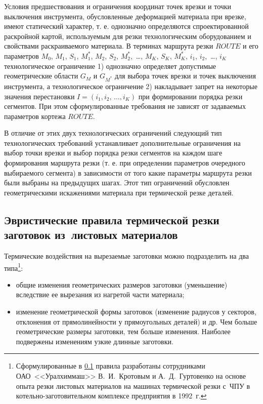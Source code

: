 \documentclass[11pt,twoside,openany]{report}
\begin{document}
Условия предшествования и ограничения координат точек врезки
и точки выключения инструмента,
обусловленные деформацией материала при врезке,
имеют статический характер,
т. е. однозначно определяются спроектированной раскройной картой,
используемым для резки технологическим оборудованием
и свойствами раскраиваемого материала.
В терминах маршрута резки $ROUTE$
и его параметров
$M_0$, $M_1$, $S_1$, $M_1^*$, $M_2$, $S_2$, $M_2^*$, \,\dots, $M_K$, $S_K$, $M_K^*$,
$i_1$, $i_2$, \,\dots, $i_K$
технологическое ограничение
1) однозначно определяет допустимые геометрические области
$G_M$
и
$G_{M^*}$
для выбора точек врезки и точек выключения инструмента,
а технологическое ограничение
2) накладывает запрет на некоторые значения перестановки
$ I = (i_1, i_2, \,\dots, i_K)$
при формировании порядка резки сегментов.
При этом сформулированные требования не зависят от задаваемых параметров кортежа
$ROUTE$.

В отличие от этих двух технологических ограничений
следующий тип технологических требований устанавливает
дополнительные ограничения на выбор точки врезки и выбор
порядка резки сегментов на каждом шаге формирования маршрута резки
(т. е. при определении параметров очередного выбираемого сегмента)
в зависимости от того какие параметры маршрута резки были выбраны на предыдущих шагах.
Этот тип ограничений обусловлен геометрическими
искажениями материала при термической резке деталей.

\subsection{
  Эвристические правила термической резки заготовок
  из~листовых материалов
}
\label{Par133}

Термические воздействия на вырезаемые заготовки можно подразделить на два типа\footnote{
  Сформулированные в \ref{Par133}
  правила разработаны сотрудниками ОАО~<<Уралхиммаш>>
  В.~И.~Кротовым и А.~Д.~Гуртовенко на основе опыта
  резки листовых материалов на машинах термической резки с~ЧПУ
  в котельно-заготовительном комплексе предприятия в 1992~г.
}:

\begin{itemize}
\item
общие изменения геометрических размеров заготовки (уменьшение)
вследствие ее вырезания из нагретой части материала;
\item
изменение геометрической формы заготовок
(изменение радиусов у секторов,
отклонения от прямолинейности у прямоугольных деталей) и др.
Чем больше геометрические размеры заготовки,
тем больше изменения.
Наиболее  подвержены изменениям узкие длинные заготовки.
\end{itemize}
\end{document}
